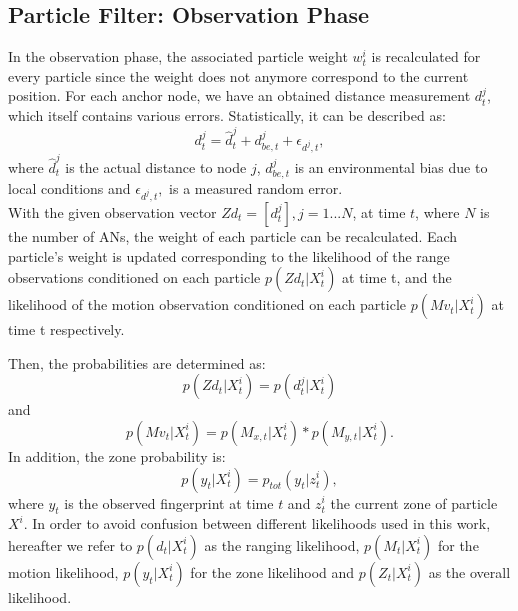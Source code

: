 \subsection{Particle Filter: Observation Phase}
In the observation phase, the associated particle weight $w^{i}_{t}$ is recalculated for every particle since the weight does not anymore correspond to the current position. For each anchor node, we have an obtained distance measurement $d^{j}_{t}$, which itself contains various errors. Statistically, it can be described as: 
\begin{equation}
d^{j}_{t} = \hat{d}^{j}_{t} + d^{j}_{be, t} + \epsilon_{d^{j}, t},
\label{eqn:distances}
\end{equation}
where $\hat{d}^{j}_{t}$ is the actual distance to node $j$, $d^{j}_{be, t}$ is an environmental bias due to local conditions and $\epsilon_{d^{j}, t},$ is a measured random error.\\
\noindent\hspace*{5mm}%
With the given observation vector $Zd_{t} = [d_{t}^{j}], j = 1...N$, at time $t$, where $N$ is the number of
ANs, the weight of each particle can be recalculated. Each particle's weight is updated corresponding to the likelihood of the range observations conditioned on each particle $p(Zd_{t} | X^{i}_{t})$ at time t, and the likelihood of the motion observation conditioned on each particle $p(Mv_{t} | X^{i}_{t})$ at time t respectively.


 Then, the probabilities are determined as:
\begin{equation}
p(Zd_{t} | X^{i}_{t}) = p(d_{t}^{j} | X^{i}_{t})
\label{eqn:probability_distance}
\end{equation}
and
\begin{equation}
p(Mv_{t} | X^{i}_{t}) = p(M_{x,t} | X^{i}_{t}) * p(M_{y,t} | X^{i}_{t}).
\label{eqn:probability_movement}
\end{equation}
In addition, the zone probability is:
\begin{equation}
p(y_t | X^{i}_{t}) = p_{tot}(y_{t} | z^{i}_{t}),
\label{eqn:probability_zone}
\end{equation}
where $y_t$ is the observed fingerprint at time $t$ and $z^{i}_{t}$ the current zone of particle $X^{i}$.
In order to avoid confusion between different likelihoods used in this work, hereafter we refer to $p(d_{t} | X^{i}_{t})$ as the ranging likelihood, $p(M_{t} | X^{i}_{t})$ for the motion likelihood, $p(y_t | X^{i}_{t})$ for the zone likelihood and $p(Z_{t} | X^{i}_{t})$ as the overall likelihood.

